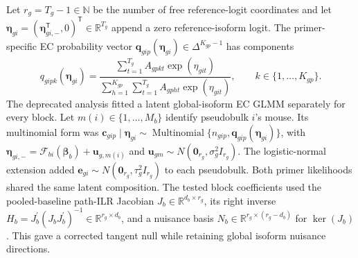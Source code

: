 \documentclass[11pt]{article}
\begin{document}
Let \(r_g=T_g-1\in\mathbb N\) be the number of free reference-logit coordinates and let \(\bm\eta_{gi}=(\bm\eta_{gi,-}^{\mathsf T},0)^{\mathsf T}\in\mathbb R^{T_g}\) append a zero reference-isoform logit. The primer-specific EC probability vector \(\bm q_{gip}(\bm\eta_{gi})\in\Delta^{K_{gp}-1}\) has components \[q_{gipk}(\bm\eta_{gi})=\frac{\sum_{t=1}^{T_g}A_{gpkt}\exp(\eta_{git})}{\sum_{h=1}^{K_{gp}}\sum_{t=1}^{T_g}A_{gpht}\exp(\eta_{git})},\qquad k\in\{1,\ldots,K_{gp}\}.\] The deprecated analysis fitted a latent global-isoform EC GLMM separately for every block. Let \(m(i)\in\{1,\ldots,M_b\}\) identify pseudobulk \(i\)'s mouse. Its multinomial form was \(\bm c_{gip}\mid\bm\eta_{gi}\sim\operatorname{Multinomial}\{n_{gip},\bm q_{gip}(\bm\eta_{gi})\}\), with \(\bm\eta_{gi,-}=\mathcal F_{bi}(\bm\beta_b)+\bm u_{g,m(i)}\) and \(\bm u_{gm}\sim N(\bm0_{r_g},\sigma_g^2I_{r_g})\). The logistic-normal extension added \(\bm e_{gi}\sim N(\bm0_{r_g},\tau_g^2I_{r_g})\) to each pseudobulk. Both primer likelihoods shared the same latent composition. The tested block coefficients used the pooled-baseline path-ILR Jacobian \(J_b\in\mathbb R^{d_b\times r_g}\), its right inverse \(H_b=J_b^\prime(J_bJ_b^\prime)^{-1}\in\mathbb R^{r_g\times d_b}\), and a nuisance basis \(N_b\in\mathbb R^{r_g\times(r_g-d_b)}\) for \(\ker(J_b)\). This gave a corrected tangent null while retaining global isoform nuisance directions.
\end{document}

